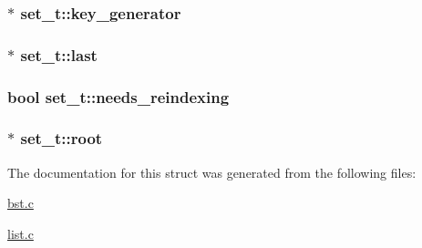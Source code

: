 \hypertarget{structset__t_aa53a1cdeaee45d7d2cb5e8ac6cc99d0e}{
\subsubsection[{key\-\_\-generator}]{$\ast$ set\-\_\-t\-::key\-\_\-generator}}\label{structset__t_aa53a1cdeaee45d7d2cb5e8ac6cc99d0e}
\hypertarget{structset__t_ad37f4230f327a80e6a639302954d27b4}{
\subsubsection[{last}]{$\ast$ set\-\_\-t\-::last}}\label{structset__t_ad37f4230f327a80e6a639302954d27b4}
\hypertarget{structset__t_a65e52aeaaca08ef6ff4d036ad2f48210}{
\subsubsection[{needs\-\_\-reindexing}]{\setlength{\rightskip}{0pt plus 5cm}bool set\-\_\-t\-::needs\-\_\-reindexing}}\label{structset__t_a65e52aeaaca08ef6ff4d036ad2f48210}
\hypertarget{structset__t_a70f3e3d6eee37c3504a98ce79c80e9f5}{
\subsubsection[{root}]{$\ast$ set\-\_\-t\-::root}}\label{structset__t_a70f3e3d6eee37c3504a98ce79c80e9f5}


The documentation for this struct was generated from the following files\-:\begin{DoxyCompactItemize}
\item 
\hyperlink{bst_8c}{bst.\-c}\item 
\hyperlink{list_8c}{list.\-c}\end{DoxyCompactItemize}
